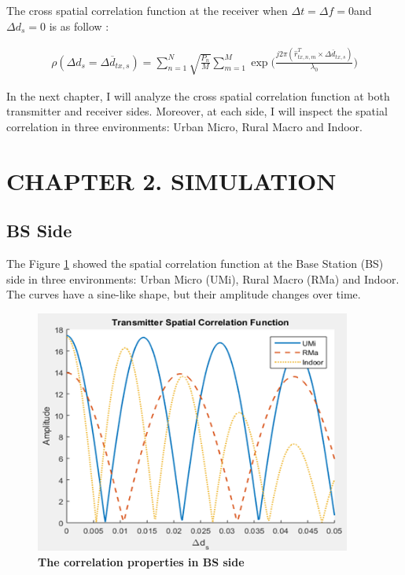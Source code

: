\documentclass{article} %
\begin{document}
The cross spatial correlation function at the receiver when $\Delta t = \Delta f = 0$and $\Delta d_s = 0$ is as follow \cite{final_exam}:
\begin{adjustwidth}{-2cm}{0cm}
\begin{equation} \label{ptMS}
\begin{split}
    \rho(\Delta d_s = \Delta \overline d_{tx,s}) = \sum_{n=1}^N \sqrt{\frac{P_n}{M}} \sum_{m=1}^M \exp \Big(\frac{j2\pi(\hat{r}_{tx,n,m}^T \times \Delta \overline{d}_{tx,s})}{\lambda_0} \Big)
\end{split}
\end{equation}
\end{adjustwidth}

In the next chapter, I will analyze the cross spatial correlation function at both transmitter and receiver sides. Moreover, at each side, I will inspect the spatial correlation in three environments: Urban Micro, Rural Macro and Indoor.

\clearpage

\section*{CHAPTER 2. SIMULATION}
\setcounter{section}{2}
\setcounter{figure}{0}
\setcounter{table}{0}
\setcounter{subsection}{0}

\subsection{BS Side}

The Figure \ref{figure2} showed the spatial correlation function at the Base Station (BS) side in three environments: Urban Micro (UMi), Rural Macro (RMa) and Indoor. The curves have a sine-like shape, but their amplitude changes over time.

\begin{figure}[!ht]
    \centering
    \includegraphics[height=8cm]{Images/figure2.png}
    \caption[The correlation properties in BS side~\cite{final_exam}]{\bfseries \fontsize{12pt}{0pt}\selectfont The correlation properties in BS side~\cite{final_exam}}
    \label{figure2}
\end{figure}
\end{document}
